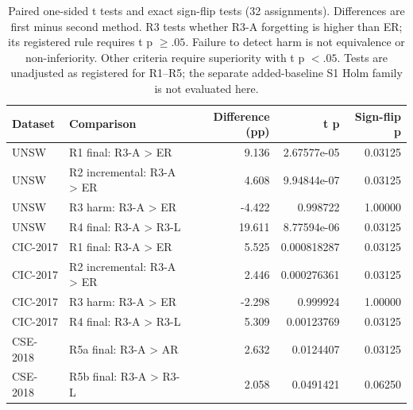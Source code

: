 \begin{table}[t]\centering\scriptsize
\caption{Paired one-sided t tests and exact sign-flip tests (32 assignments). Differences are first minus second method. R3 tests whether R3-A forgetting is higher than ER; its registered rule requires t p $\geq .05$. Failure to detect harm is not equivalence or non-inferiority. Other criteria require superiority with t p $< .05$. Tests are unadjusted as registered for R1--R5; the separate added-baseline S1 Holm family is not evaluated here.}
\label{tab:section165-tests}
\begin{tabular}{llrrr}\toprule
Dataset & Comparison & Difference (pp) & t p & Sign-flip p \\\midrule
UNSW & R1 final: R3-A > ER & 9.136 & 2.67577e-05 & 0.03125 \\
UNSW & R2 incremental: R3-A > ER & 4.608 & 9.94844e-07 & 0.03125 \\
UNSW & R3 harm: R3-A > ER & -4.422 & 0.998722 & 1.00000 \\
UNSW & R4 final: R3-A > R3-L & 19.611 & 8.77594e-06 & 0.03125 \\
CIC-2017 & R1 final: R3-A > ER & 5.525 & 0.000818287 & 0.03125 \\
CIC-2017 & R2 incremental: R3-A > ER & 2.446 & 0.000276361 & 0.03125 \\
CIC-2017 & R3 harm: R3-A > ER & -2.298 & 0.999924 & 1.00000 \\
CIC-2017 & R4 final: R3-A > R3-L & 5.309 & 0.00123769 & 0.03125 \\
CSE-2018 & R5a final: R3-A > AR & 2.632 & 0.0124407 & 0.03125 \\
CSE-2018 & R5b final: R3-A > R3-L & 2.058 & 0.0491421 & 0.06250 \\
\bottomrule\end{tabular}\end{table}

